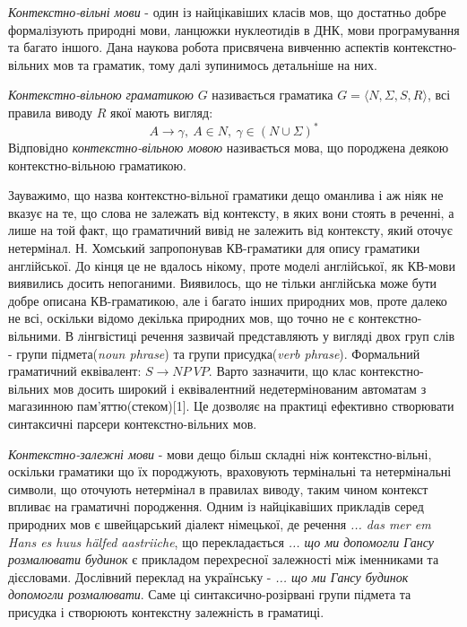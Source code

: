 \textit{Контекстно-вільні мови} - один із найцікавіших класів мов, що достатньо добре формалізують природні мови, ланцюжки нуклеотидів в ДНК, мови програмування та багато іншого. Дана наукова робота присвячена вивченню аспектів контекстно-вільних мов та граматик, тому далі зупинимось детальніше на них.
\begin{definition}
\textit{Контекстно-вільною граматикою} $G$ називається граматика $ G = \big\langle N, \Sigma, S, R \big\rangle $, всі правила виводу $R$ якої мають вигляд:
$$ A \rightarrow \gamma,\ A \in N,\ \gamma \in \left(N \cup \Sigma \right)^* $$
Відповідно \textit{контекстно-вільною мовою} називається мова, що породжена деякою контекстно-вільною граматикою.
\end{definition}
Зауважимо, що назва контекстно-вільної граматики дещо оманлива і аж ніяк не вказує на те, що слова не залежать від контексту,
в яких вони стоять в реченні, а лише на той факт, що граматичний вивід не залежить від контексту, який оточує нетермінал.
Н. Хомський запропонував КВ-граматики для опису граматики англійської. До кінця це не вдалось нікому, проте моделі англійської, як КВ-мови виявились досить непоганими. Виявилось, що не тільки англійська може бути добре описана КВ-граматикою, але і багато інших природних мов, проте далеко не всі, оскільки відомо декілька природних мов, що точно не є контекстно-вільними. В лінгвістиці речення зазвичай представляють у вигляді двох груп слів - групи підмета(\textit{noun phrase}) та групи присудка(\textit{verb phrase}). Формальний граматичний еквівалент: $S \rightarrow NP\ VP$. Варто зазначити, що клас контекстно-вільних мов досить широкий і еквівалентний недетермінованим автоматам з магазинною пам'яттю(стеком)[1]. Це дозволяє на практиці ефективно створювати синтаксичні парсери контекстно-вільних мов.

\textit{Контекстно-залежні мови} - мови дещо більш складні ніж контекстно-вільні, оскільки граматики що їх породжують, враховують термінальні та нетермінальні символи, що оточують нетермінал в правилах виводу, таким чином контекст впливає на граматичні породження. Одним із найцікавіших прикладів серед природних мов є швейцарський діалект німецької, де речення
\textit{... das mer em Hans es huus hälfed aastriiche}, що перекладається \textit{... що ми допомогли Гансу розмалювати будинок} є прикладом перехресної залежності між іменниками та дієсловами. Дослівний переклад на українську - \textit{... що ми Гансу будинок допомогли розмалювати}. Саме ці синтаксично-розірвані групи підмета та присудка і створюють контекстну залежність в граматиці.

